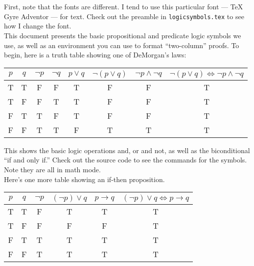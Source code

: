 \documentclass{article}
\begin{document}
\\
\noindent\makebox[\linewidth]{\rule{\linewidth}{0.4pt}}\\

First, note that the fonts are different. I tend to use this particular font
--- \TeX{} Gyre Adventor --- for text. Check out the preamble in
{\tt logicsymbols.tex} to see how I change the font.\\

This document presents the basic propositional and predicate logic symbols we
use, as well as an environment you can use to format ``two-column'' proofs. To
begin, here is a truth table showing one of DeMorgan's laws:
\begin{center}
  \begin{tabular}{|c|c||c|c|c|c|c||c|}
    \hline
    $p$ & $q$ & $\lnot p$ & $\lnot q$ & $p\lor q$ & $\lnot(p\lor q)$ & $\lnot
    p\land\lnot q$ & $\lnot(p\lor q)\iff\lnot p\land\lnot q$\\ \hline\hline
    T & T & F & F & T & F & F & T\\ \hline
    T & F & F & T & T & F & F & T\\ \hline
    F & T & T & F & T & F & F & T\\ \hline
    F & F & T & T & F & T & T & T\\ \hline
  \end{tabular}
\end{center}

This shows the basic logic operations and, or and not, as well as the
biconditional ``if and only if.'' Check out the source code to see the commands
for the symbols. Note they are all in math mode.\\

Here's one more table showing an if-then proposition.
\begin{center}
  \begin{tabular}{|c|c||c|c|c||c|}
    \hline
    $p$ & $q$ & $\lnot p$ & $(\lnot p)\lor q$ & $p\to q$ & $(\lnot p)\lor q\iff
    p\to q$\\ \hline\hline
    T & T & F & T & T & T\\ \hline
    T & F & F & F & F & T\\ \hline
    F & T & T & T & T & T\\ \hline
    F & F & T & T & T & T\\ \hline
  \end{tabular}
\end{center}
\end{document}

